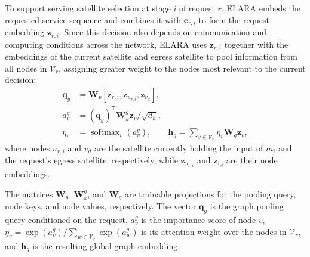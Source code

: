 \documentclass[10pt, conference, letterpaper]{IEEEtran}
\begin{document}

To support serving satellite selection at stage $i$ of request $r$, ELARA embeds the requested service sequence and combines it with $\mathbf c_{r,i}$ to form the request embedding $\mathbf z_{r,i}$. Since this decision also depends on communication and computing conditions across the network, ELARA uses $\mathbf z_{r,i}$ together with the embeddings of the current satellite and egress satellite to pool information from all nodes in $\mathcal V_r$, assigning greater weight to the nodes most relevant to the current decision:
\begin{align}
\mathbf q_g&=\mathbf W_p[\mathbf z_{r,i},\mathbf z_{u_{r,i}},\mathbf z_{v_d}],\nonumber\\
a_v^g&=(\mathbf q_g)^{\mathsf T}\mathbf W_k^g\mathbf z_v/\sqrt{d_h},\nonumber\\
\eta_v&=\operatorname{softmax}_{v}(a_v^g),\qquad
\mathbf h_g=\sum_{v\in\mathcal V_r}\eta_v\mathbf W_g\mathbf z_v,
\label{eq:global_graph_embedding}
\end{align}
where nodes $u_{r,i}$ and $v_d$ are the satellite currently holding the input of $m_i$ and the request's egress satellite, respectively, while $\mathbf z_{u_{r,i}}$ and $\mathbf z_{v_d}$ are their node embeddings. 

The matrices $\mathbf W_p$, $\mathbf W_k^g$, and $\mathbf W_g$ are trainable projections for the pooling query, node keys, and node values, respectively. The vector $\mathbf q_g$ is the graph pooling query conditioned on the request, $a_v^g$ is the importance score of node $v$, $\eta_v=\exp(a_v^g)/\sum_{w\in\mathcal V_r}\exp(a_w^g)$ is its attention weight over the nodes in $\mathcal V_r$, and $\mathbf h_g$ is the resulting global graph embedding.
\end{document}
